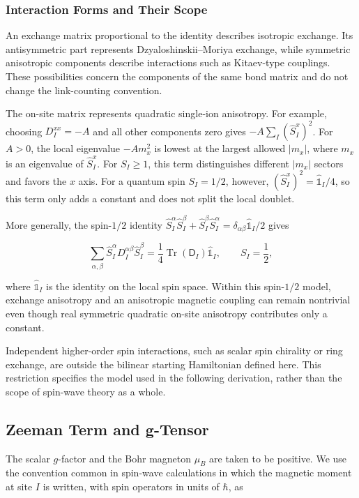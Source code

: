 \subsubsection{Interaction Forms and Their Scope}

An exchange matrix proportional to the identity describes isotropic exchange. Its antisymmetric part represents Dzyaloshinskii--Moriya exchange, while symmetric anisotropic components describe interactions such as Kitaev-type couplings. These possibilities concern the components of the same bond matrix and do not change the link-counting convention.

The on-site matrix represents quadratic single-ion anisotropy. For example, choosing \(D_I^{xx}=-A\) and all other components zero gives \(-A\sum_I(\hat S_I^x)^2\). For \(A>0\), the local eigenvalue \(-A m_x^2\) is lowest at the largest allowed \(|m_x|\), where \(m_x\) is an eigenvalue of \(\hat S_I^x\). For \(S_I\ge1\), this term distinguishes different \(|m_x|\) sectors and favors the \(x\) axis. For a quantum spin \(S_I=1/2\), however, \((\hat S_I^x)^2=\hat{\mathbb 1}_I/4\), so this term only adds a constant and does not split the local doublet.

More generally, the spin-\(1/2\) identity \(\hat S_I^\alpha\hat S_I^\beta+\hat S_I^\beta\hat S_I^\alpha=\delta_{\alpha\beta}\hat{\mathbb 1}_I/2\) gives

\[
\sum_{\alpha,\beta}
\hat S_I^\alpha D_I^{\alpha\beta}\hat S_I^\beta
=\frac14\operatorname{Tr}(\mathsf D_I)\hat{\mathbb 1}_I,
\qquad S_I=\frac12,
\]

where \(\hat{\mathbb 1}_I\) is the identity on the local spin space. Within this spin-\(1/2\) model, exchange anisotropy and an anisotropic magnetic coupling can remain nontrivial even though real symmetric quadratic on-site anisotropy contributes only a constant.

Independent higher-order spin interactions, such as scalar spin chirality or ring exchange, are outside the bilinear starting Hamiltonian defined here. This restriction specifies the model used in the following derivation, rather than the scope of spin-wave theory as a whole.

\subsection{Zeeman Term and g-Tensor}

The scalar \(g\)-factor and the Bohr magneton \(\mu_B\) are taken to be positive. We use the convention common in spin-wave calculations in which the magnetic moment at site \(I\) is written, with spin operators in units of \(\hbar\), as

